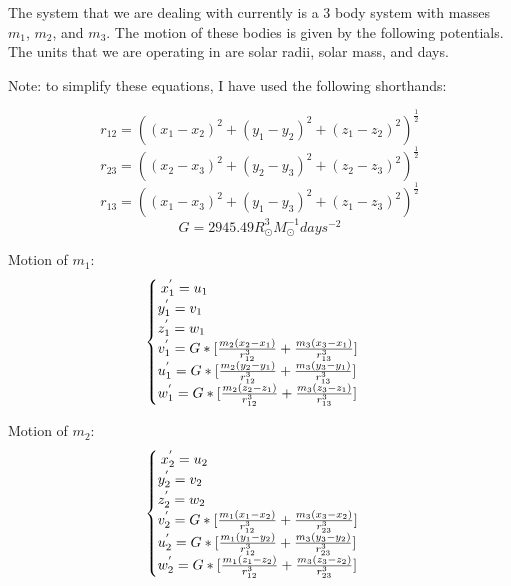\documentclass[letterpaper,12pt]{article}
\begin{document}
The system that we are dealing with currently is a 3 body system with masses $m_{1}$, $m_{2}$, and $m_{3}$. The motion of these bodies is given by the following potentials. The units that we are operating in are solar radii, solar mass, and days.

Note: to simplify these equations, I have used the following shorthands:

\begin{equation}
    r_{12} = ((x_{1} - x_{2})^{2} + (y_{1} - y_{2})^{2} + (z_{1} - z_{2})^{2})^{\frac{1}{2}}
\end{equation}
\begin{equation}
    r_{23} = ((x_{2} - x_{3})^{2} + (y_{2} - y_{3})^{2} + (z_{2} - z_{3})^{2})^{\frac{1}{2}}
\end{equation}
\begin{equation}
    r_{13} = ((x_{1} - x_{3})^{2} + (y_{1} - y_{3})^{2} + (z_{1} - z_{3})^{2})^{\frac{1}{2}}
\end{equation}
\begin{equation}
    G = 2945.49 R_{\odot}^{3}M_{\odot}^{-1}days^{-2}
\end{equation}
    


Motion of $m_{1}$:
\begin{equation}
\begin{cases}
\hspace{0.22em} x_{1}^{'} = u_{1}\\
y_{1}^{'} = v_{1}\\
z_{1}^{'} = w_{1}\\
v_{1}^{'} = G*[\frac{m_{2}(x_{2}-x_{1})}{r_{12}^{3}}+\frac{m_{3}(x_{3}-x_{1})}{r_{13}^{3}}]\\
u_{1}^{'} =G*[\frac{m_{2}(y_{2}-y_{1})}{r_{12}^{3}}+\frac{m_{3}(y_{3}-y_{1})}{r_{13}^{3}}]\\
w_{1}^{'} =G*[\frac{m_{2}(z_{2}-z_{1})}{r_{12}^{3}}+\frac{m_{3}(z_{3}-z_{1})}{r_{13}^{3}}]\\

\end{cases}
\label{eq:potential}
\end{equation}

Motion of $m_{2}$:
\begin{equation}
\begin{cases}
\hspace{0.22em} x_{2}^{'} = u_{2}\\
y_{2}^{'} = v_{2}\\
z_{2}^{'} = w_{2}\\
v_{2}^{'} = G*[\frac{m_{1}(x_{1}-x_{2})}{r_{12}^{3}}+\frac{m_{3}(x_{3}-x_{2})}{r_{23}^{3}}]\\
u_{2}^{'} =G*[\frac{m_{1}(y_{1}-y_{2})}{r_{12}^{3}}+\frac{m_{3}(y_{3}-y_{2})}{r_{23}^{3}}]\\
w_{2}^{'} =G*[\frac{m_{1}(z_{1}-z_{2})}{r_{12}^{3}}+\frac{m_{3}(z_{3}-z_{2})}{r_{23}^{3}}]\\
\end{cases}
\label{eq:potential}
\end{equation}
\end{document}
